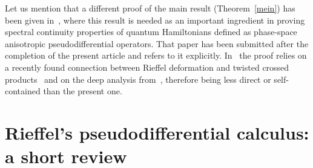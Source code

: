 \documentclass[pdftex]{sigma}
\begin{document}
Let us mention that a dif\/ferent proof of the main result (Theorem~\ref{mein}) has been given in~\cite{BM}, where this result is needed as an important ingredient in proving spectral continuity properties of quantum Hamiltonians def\/ined as phase-space anisotropic pseudodif\/ferential operators. That paper has been submitted after the completion of the present article and refers to it explicitly. In~\cite{BM} the proof relies on a recently found connection between Rief\/fel deformation and twisted crossed products~\cite{BMa} and on the deep analysis from~\cite{Rie}, therefore being less direct or self-contained than the present one.



\section{Rief\/fel's pseudodif\/ferential calculus: a short review}\label{sectra}
\end{document}
